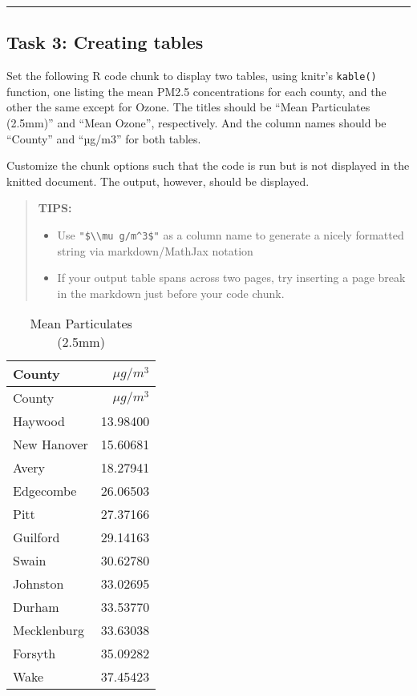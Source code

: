 \documentclass[
]{article}
\begin{document}
\begin{center}\rule{0.5\linewidth}{0.5pt}\end{center}

\hypertarget{task-3-creating-tables}{%
\subsection{Task 3: Creating tables}\label{task-3-creating-tables}}

Set the following R code chunk to display two tables, using knitr's
\texttt{kable()} function, one listing the mean PM2.5 concentrations for
each county, and the other the same except for Ozone. The titles should
be ``Mean Particulates (2.5mm)'' and ``Mean Ozone'', respectively. And
the column names should be ``County'' and ``µg/m3'' for both tables.

Customize the chunk options such that the code is run but is not
displayed in the knitted document. The output, however, should be
displayed.

\begin{quote}
\textbf{TIPS:}

\begin{itemize}
\item
  Use \texttt{"\$\textbackslash{}\textbackslash{}mu\ g/m\^{}3\$"} as a
  column name to generate a nicely formatted string via markdown/MathJax
  notation
\item
  If your output table spans across two pages, try inserting a page
  break in the markdown just before your code chunk.
\end{itemize}
\end{quote}

\newpage

\begin{longtable}[]{@{}lr@{}}
\caption{Mean Particulates (2.5mm)}\tabularnewline
\toprule\noalign{}
County & \(\mu g/m^3\) \\
\midrule\noalign{}
\endfirsthead
\toprule\noalign{}
County & \(\mu g/m^3\) \\
\midrule\noalign{}
\endhead
\bottomrule\noalign{}
\endlastfoot
Haywood & 13.98400 \\
New Hanover & 15.60681 \\
Avery & 18.27941 \\
Edgecombe & 26.06503 \\
Pitt & 27.37166 \\
Guilford & 29.14163 \\
Swain & 30.62780 \\
Johnston & 33.02695 \\
Durham & 33.53770 \\
Mecklenburg & 33.63038 \\
Forsyth & 35.09282 \\
Wake & 37.45423 \\
\end{longtable}
\end{document}
